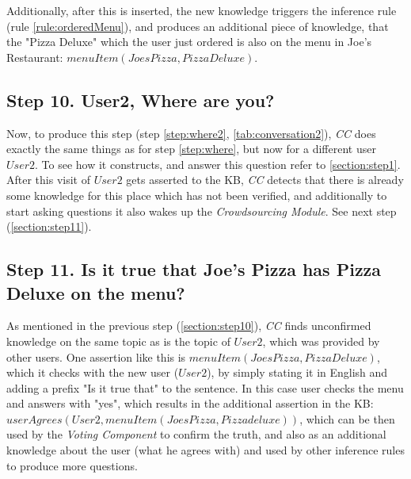 Additionally, after this is inserted, the new knowledge triggers the inference
rule (rule \ref{rule:orderedMenu}), and produces an additional piece of 
knowledge, that the "Pizza Deluxe" which the user just ordered is also on the
menu in Joe's Restaurant: $menuItem(JoesPizza,PizzaDeluxe)$.

\subsection{Step 10. User2, Where are you?}
\label{section:step10}
Now, to produce this step (step \ref{step:where2}, \autoref{tab:conversation2}),
\emph{CC} does exactly the same things as for step \ref{step:where}, but now
for a different user $User2$. To see how it constructs, and answer this 
question refer to \autoref{section:step1}. After this visit of $User2$ gets 
asserted to the KB, \emph{CC} detects that there is already some knowledge
for this place which has not been verified, and additionally to start asking
questions it also wakes up  the \emph{Crowdsourcing Module}. See next step
(\autoref{section:step11}).

\subsection{Step 11. Is it true that Joe's Pizza has Pizza Deluxe on the menu?}
\label{section:step11}
As mentioned in the previous step (\autoref{section:step10}), \emph{CC} 
finds unconfirmed knowledge on the same topic as is the topic of $User2$, which
was provided by other users. One assertion like this is 
$menuItem(JoesPizza,PizzaDeluxe)$, which it checks with the new user ($User2$),
by simply stating it in English and adding a prefix "Is it true that" to the
sentence.
In this case user checks the menu and answers with "yes", which results in the
additional assertion in the KB: 
$userAgrees(User2,menuItem(JoesPizza,Pizzadeluxe))$, which can be then used
by the \emph{Voting Component} to confirm the truth, and also as an additional
knowledge about the user (what he agrees with) and used by other inference
rules to produce more questions.

